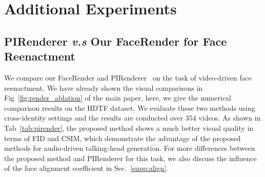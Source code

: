 \appendix
\label{sec:appendix}
\renewcommand\thetable{\Alph{section}\arabic{table}}   
\renewcommand\thefigure{\Alph{section}\arabic{figure}}  









\section{Additional Experiments}
\label{sec:A}


\subsection{PIRenderer \emph{v.s} Our FaceRender for Face Reenactment}
We compare our FaceRender and PIRenderer~\cite{ren2021pirenderer} on the task of video-driven face reenactment. We have already shown the visual comparisons in Fig~\ref{fig:render_ablation} of the main paper, here, we give the numerical comparison results on the HDTF dataset. We evaluate these two methods using cross-identity settings and the results are conducted over 354 videos. As shown in Tab~\ref{tab:pirender}, the proposed method shows a much better visual quality in terms of FID and CSIM, which demonstrate the advantage of the proposed methods for audio-driven talking-head generation. For more differences between the proposed method and PIRenderer for this task, we also discuss the influence of the face alignment coefficient in Sec.~\ref{supp:align}.





